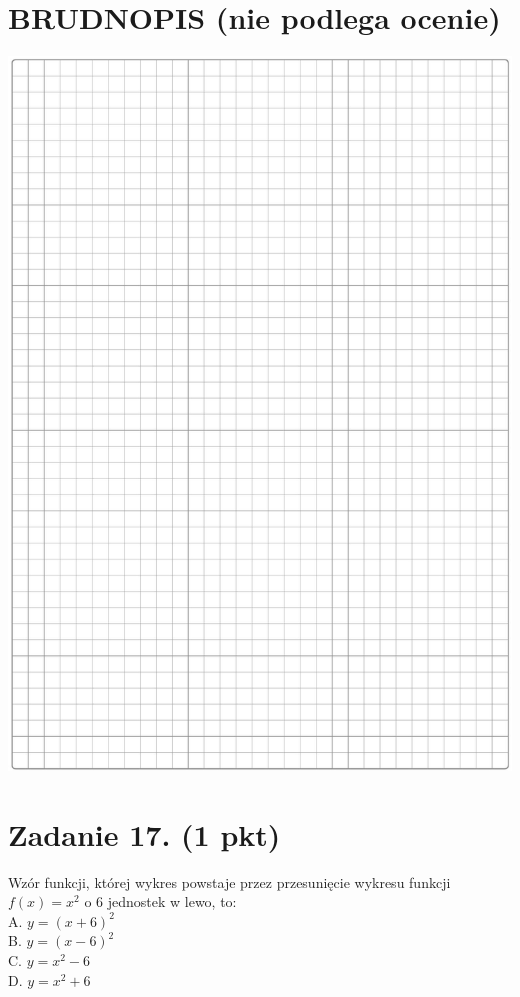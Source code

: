 \documentclass[10pt]{article}
\begin{document}
\section*{BRUDNOPIS (nie podlega ocenie)}
\begin{center}
\includegraphics[max width=\textwidth]{2024_11_21_fd9e49107d1ddcec5cd8g-05}
\end{center}

\section*{Zadanie 17. (1 pkt)}
Wzór funkcji, której wykres powstaje przez przesunięcie wykresu funkcji \(f(x)=x^{2}\) o 6 jednostek w lewo, to:\\
A. \(y=(x+6)^{2}\)\\
B. \(y=(x-6)^{2}\)\\
C. \(y=x^{2}-6\)\\
D. \(y=x^{2}+6\)
\end{document}
